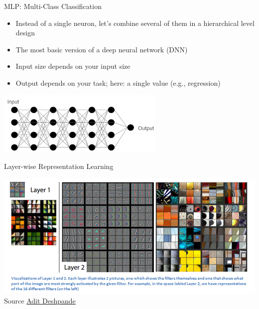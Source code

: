 \documentclass[aspectratio=169]{../latex_main/tntbeamer}  %
\begin{document}
  	\begin{frame}{MLP: Multi-Class Classification}

        \begin{itemize}
            \item Instead of a single neuron, let's combine several of them in a hierarchical level design
            \item The most basic version of a deep neural network (DNN)
            \item Input size depends on your input size
            \item Output depends on your task; here: a single value (e.g., regression)
        \end{itemize}

        \centering
        \includegraphics[width=0.6\textwidth]{figure/mlp1.png}
                
	\end{frame}


        \begin{frame}{Layer-wise Representation Learning}

            \centering
            \includegraphics[width=.8\linewidth]{figure/deconvnet.png}\\
            Source \href{https://adeshpande3.github.io/The-9-Deep-Learning-Papers-You-Need-To-Know-About.html}{Adit Deshpande}
            
        \end{frame}
        
\end{document}
